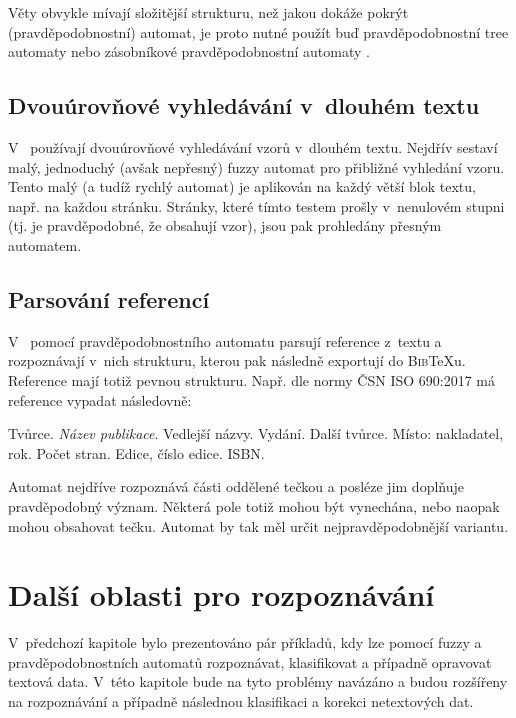 Věty obvykle mívají složitější strukturu, než jakou dokáže pokrýt  (pravděpodobnostní) automat, je proto nutné použít buď pravděpodobnostní tree automaty \cite{KniGra-OvProTreTraNatLanPro} nebo zásobníkové pravděpodobnostní automaty \cite{WaMan-ProFiStMaRegBaMTEva}.

\subsection{Dvouúrovňové vyhledávání v~dlouhém textu}

V~\cite{Hun-NoLiTexSeaUsFuFiStLiNoDetAut} používají dvouúrovňové vyhledávání vzorů v~dlouhém textu. Nejdřív sestaví malý, jednoduchý (avšak nepřesný) fuzzy automat pro přibližné vyhledání vzoru. Tento malý (a tudíž rychlý automat) je aplikován na každý větší blok textu, např. na každou stránku. Stránky, které tímto testem prošly v~nenulovém stupni (tj. je pravděpodobné, že obsahují vzor), jsou pak prohledány přesným automatem.

\subsection{Parsování referencí}
V~\cite{Kra+-BibMeExUsiPrFiStTra} pomocí pravděpodobnostního automatu parsují reference z~textu a rozpoznávají v~nich strukturu, kterou pak následně exportují do \textsc{Bib}\TeX u. Reference mají totiž pevnou strukturu. Např. dle normy ČSN ISO 690:2017\cite{web-CesCitNorm} má reference vypadat následovně:

Tvůrce. \textit{Název publikace}. Vedlejší názvy. Vydání. Další tvůrce. Místo: nakladatel, rok. Počet stran. Edice, číslo edice. ISBN.

Automat nejdříve rozpoznává části oddělené tečkou a posléze jim doplňuje pravděpodobný význam. Některá pole totiž mohou být vynechána, nebo naopak mohou obsahovat tečku. Automat by tak měl určit nejpravděpodobnější variantu.

\section{Další oblasti pro rozpoznávání}
V~předchozí kapitole bylo prezentováno pár příkladů, kdy lze pomocí fuzzy a pravděpodobnostních automatů rozpoznávat, klasifikovat a případně opravovat textová data. V~této kapitole bude na tyto problémy navázáno a budou rozšířeny na rozpoznávání a případně následnou klasifikaci a korekci netextových dat.

